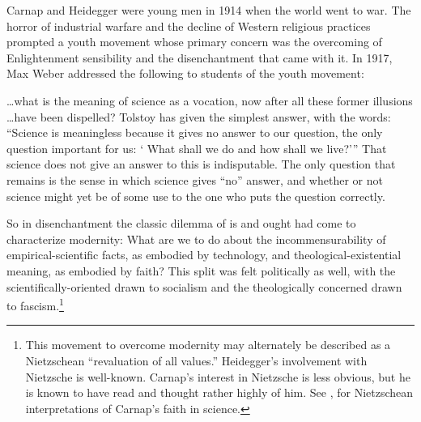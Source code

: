 \documentclass[leqno, 12pt]{turabian-researchpaper}
\begin{document}
	Carnap and Heidegger were young men in 1914 when the world went to war. The
	horror of industrial warfare and the decline of Western religious practices
	prompted a youth movement whose primary concern was the overcoming of
	Enlightenment sensibility and the disenchantment that came with it. In 1917,
	Max Weber addressed the following to students of the youth movement:
	\begin{displayquote}
		 \dots what is the meaning of science as a vocation,
		now after all these former illusions \dots have been dispelled? Tolstoy has given
		the simplest answer, with the words: \enquote{Science is meaningless because it gives %
		no answer to our question, the only question important for us: \enquote{%
		What shall we do and how shall we live?}}
		That science does not give an answer to this is indisputable. The only question
		that remains is the sense in which science gives \enquote{no} answer, and whether
		or not science might yet be of some use to the one who puts the question correctly.
	\end{displayquote}
	So in disenchantment the classic dilemma of is and ought had come to characterize
	modernity: What are we to do about the incommensurability of empirical-scientific
	facts, as embodied by technology, and theological-existential meaning, as embodied
	by faith? This split was felt politically as well, with the scientifically-oriented
	drawn to socialism and the theologically concerned drawn to fascism.\footnote{This
	movement to overcome modernity may alternately be described as a Nietzschean
	\enquote{revaluation of all values.} Heidegger's involvement with Nietzsche is
	well-known. Carnap's interest in Nietzsche is less obvious, but he is known to
	have read and thought rather highly of him. See \autocite{sachs2011a},
	\autocite[n22]{stone2017} for Nietzschean interpretations of Carnap's faith in
	science.}
\end{document}
